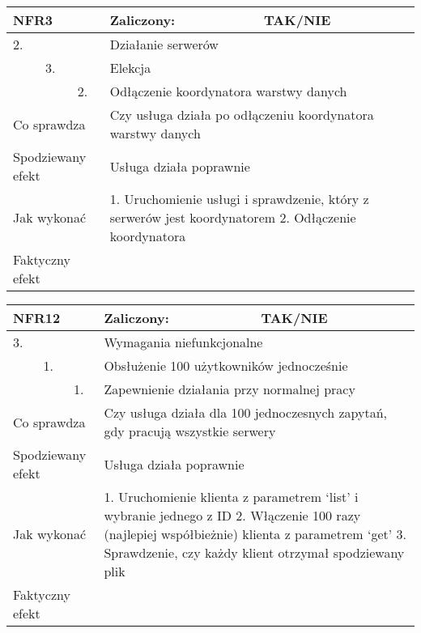 \begin{tabular}{|p{20pt}|p{20pt}|p{20pt}|p{250pt}|p{60pt}|}
	\hline
	\multicolumn{3}{|p{70pt}|}{NFR3} & Zaliczony: & TAK/NIE \\ \hline
	2. & & & \multicolumn{2}{|p{310pt}|}{Działanie serwerów } \\ \hline
	& 3. & & \multicolumn{2}{|p{310pt}|}{Elekcja } \\ \hline
	& & 2. & \multicolumn{2}{|p{310pt}|}{Odłączenie koordynatora warstwy danych } \\ \hline
	\multicolumn{3}{|p{70pt}|}{Co sprawdza} & \multicolumn{2}{|p{310pt}|}{Czy usługa działa po odłączeniu koordynatora warstwy danych} \\ \hline
	\multicolumn{3}{|p{70pt}|}{Spodziewany efekt} & \multicolumn{2}{|p{310pt}|}{Usługa działa poprawnie} \\ \hline
	\multicolumn{3}{|p{70pt}|}{Jak wykonać} & \multicolumn{2}{|p{310pt}|}{1. Uruchomienie usługi i sprawdzenie, który z serwerów jest koordynatorem
2. Odłączenie koordynatora} \\ \hline
	\multicolumn{3}{|p{70pt}|}{Faktyczny efekt} & \multicolumn{2}{|p{310pt}|}{} \\ \hline
\end{tabular}

\begin{tabular}{|p{20pt}|p{20pt}|p{20pt}|p{250pt}|p{60pt}|}
	\hline
	\multicolumn{3}{|p{70pt}|}{NFR12} & Zaliczony: & TAK/NIE \\ \hline
	3. & & & \multicolumn{2}{|p{310pt}|}{Wymagania niefunkcjonalne } \\ \hline
	& 1. & & \multicolumn{2}{|p{310pt}|}{Obsłużenie 100 użytkowników jednocześnie } \\ \hline
	& & 1. & \multicolumn{2}{|p{310pt}|}{Zapewnienie działania przy normalnej pracy } \\ \hline
	\multicolumn{3}{|p{70pt}|}{Co sprawdza} & \multicolumn{2}{|p{310pt}|}{Czy usługa działa dla 100 jednoczesnych zapytań, gdy pracują wszystkie serwery} \\ \hline
	\multicolumn{3}{|p{70pt}|}{Spodziewany efekt} & \multicolumn{2}{|p{310pt}|}{Usługa działa poprawnie} \\ \hline
	\multicolumn{3}{|p{70pt}|}{Jak wykonać} & \multicolumn{2}{|p{310pt}|}{1. Uruchomienie klienta z parametrem ‘list’ i wybranie jednego z ID
2. Włączenie 100 razy (najlepiej współbieżnie) klienta z parametrem ‘get’
3. Sprawdzenie, czy każdy klient otrzymał spodziewany plik} \\ \hline
	\multicolumn{3}{|p{70pt}|}{Faktyczny efekt} & \multicolumn{2}{|p{310pt}|}{} \\ \hline
\end{tabular}

